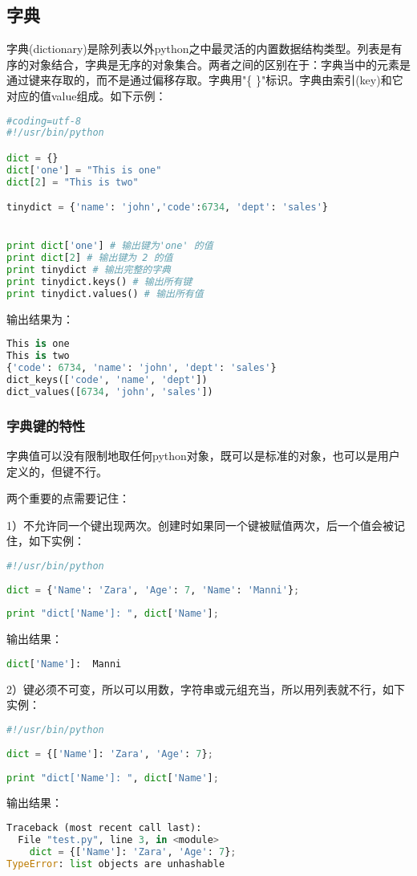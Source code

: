 \subsection{字典}
字典(dictionary)是除列表以外python之中最灵活的内置数据结构类型。列表是有序的对象结合，字典是无序的对象集合。两者之间的区别在于：字典当中的元素是通过键来存取的，而不是通过偏移存取。字典用"\{ \}"标识。字典由索引(key)和它对应的值value组成。如下示例：
\begin{lstlisting}[language=Python]
#coding=utf-8
#!/usr/bin/python

dict = {}
dict['one'] = "This is one"
dict[2] = "This is two"

tinydict = {'name': 'john','code':6734, 'dept': 'sales'}


print dict['one'] # 输出键为'one' 的值
print dict[2] # 输出键为 2 的值
print tinydict # 输出完整的字典
print tinydict.keys() # 输出所有键
print tinydict.values() # 输出所有值
\end{lstlisting}
输出结果为：
\begin{lstlisting}[language=Python]
This is one
This is two
{'code': 6734, 'name': 'john', 'dept': 'sales'}
dict_keys(['code', 'name', 'dept'])
dict_values([6734, 'john', 'sales'])
\end{lstlisting}


\subsubsection{字典键的特性}
字典值可以没有限制地取任何python对象，既可以是标准的对象，也可以是用户定义的，但键不行。

两个重要的点需要记住：

1）不允许同一个键出现两次。创建时如果同一个键被赋值两次，后一个值会被记住，如下实例：
\begin{lstlisting}[language=Python]
#!/usr/bin/python
 
dict = {'Name': 'Zara', 'Age': 7, 'Name': 'Manni'};
 
print "dict['Name']: ", dict['Name'];
\end{lstlisting}
输出结果：
\begin{lstlisting}[language=Python]
dict['Name']:  Manni
\end{lstlisting}

2）键必须不可变，所以可以用数，字符串或元组充当，所以用列表就不行，如下实例：
\begin{lstlisting}[language=Python]
#!/usr/bin/python
 
dict = {['Name']: 'Zara', 'Age': 7};
 
print "dict['Name']: ", dict['Name'];
\end{lstlisting}
输出结果：
\begin{lstlisting}[language=Python]
Traceback (most recent call last):
  File "test.py", line 3, in <module>
    dict = {['Name']: 'Zara', 'Age': 7};
TypeError: list objects are unhashable
\end{lstlisting}



